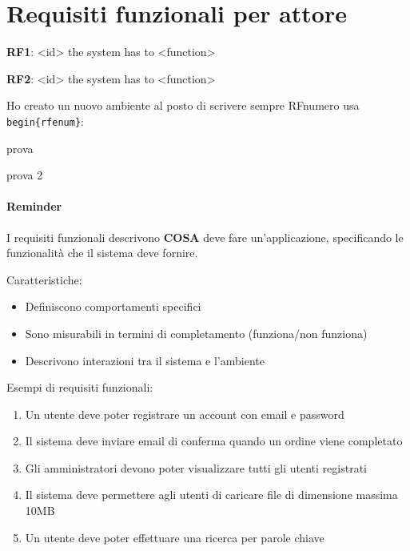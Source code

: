 \section{Requisiti funzionali per attore}


\textbf{RF1}: <id> the system has to <function>

\textbf{RF2}: <id> the system has to <function>

Ho creato un nuovo ambiente al posto di scrivere sempre RFnumero usa \verb|begin{rfenum}|:

\begin{rfenum}

    \item prova
    \item prova 2

\end{rfenum}

\paragraph{Reminder}
I requisiti funzionali descrivono \textbf{COSA} deve fare un'applicazione, specificando le funzionalità che il sistema deve fornire.

Caratteristiche:

\begin{itemize}
    \item Definiscono comportamenti specifici
    \item Sono misurabili in termini di completamento (funziona/non funziona)
    \item Descrivono interazioni tra il sistema e l'ambiente
\end{itemize}

Esempi di requisiti funzionali:

\begin{enumerate}
    \item Un utente deve poter registrare un account con email e password
    \item Il sistema deve inviare email di conferma quando un ordine viene completato
    \item Gli amministratori devono poter visualizzare tutti gli utenti registrati
    \item Il sistema deve permettere agli utenti di caricare file di dimensione massima 10MB
    \item Un utente deve poter effettuare una ricerca per parole chiave
\end{enumerate}